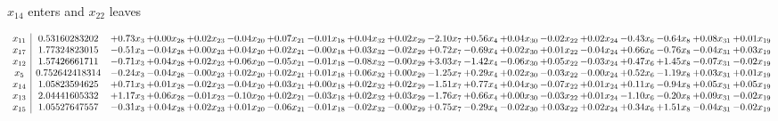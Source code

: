 \documentclass[9pt]{article}
\begin{document}
 $ x_{14} $ enters and $ x_{22} $ leaves 

 \[\begin{array}{c| c c@{\hskip 2pt} c@{\hskip 2pt} c@{\hskip 2pt} c@{\hskip 2pt} c@{\hskip 2pt} c@{\hskip 2pt} c@{\hskip 2pt} c@{\hskip 2pt} c@{\hskip 2pt} c@{\hskip 2pt} c@{\hskip 2pt} c@{\hskip 2pt} c@{\hskip 2pt} c@{\hskip 2pt} c@{\hskip 2pt} c@{\hskip 2pt} c@{\hskip 2pt} }
 x_{11}   &  0.53160283202 & +  0.73 x_{3} & +  0.00 x_{28} & +  0.02 x_{23} & -0.04 x_{20} & +  0.07 x_{21} & -0.01 x_{18} & +  0.04 x_{32} & +  0.02 x_{29} & -2.10 x_{7} & +  0.56 x_{4} & +  0.04 x_{30} & -0.02 x_{22} & +  0.02 x_{24} & -0.43 x_{6} & -0.64 x_{8} & +  0.08 x_{31} & +  0.01 x_{19}\\
 x_{17}   &  1.77324823015 & -0.51 x_{3} & -0.04 x_{28} & +  0.00 x_{23} & +  0.04 x_{20} & +  0.02 x_{21} & -0.00 x_{18} & +  0.03 x_{32} & -0.02 x_{29} & +  0.72 x_{7} & -0.69 x_{4} & +  0.02 x_{30} & +  0.01 x_{22} & -0.04 x_{24} & +  0.66 x_{6} & -0.76 x_{8} & -0.04 x_{31} & +  0.03 x_{19}\\
 x_{12}   &  1.57426661711 & -0.71 x_{3} & +  0.04 x_{28} & +  0.02 x_{23} & +  0.06 x_{20} & -0.05 x_{21} & -0.01 x_{18} & -0.08 x_{32} & -0.00 x_{29} & +  3.03 x_{7} & -1.42 x_{4} & -0.06 x_{30} & +  0.05 x_{22} & -0.03 x_{24} & +  0.47 x_{6} & +  1.45 x_{8} & -0.07 x_{31} & -0.02 x_{19}\\
 x_{5}   &  0.752642418314 & -0.24 x_{3} & -0.04 x_{28} & -0.00 x_{23} & +  0.02 x_{20} & +  0.02 x_{21} & +  0.01 x_{18} & +  0.06 x_{32} & +  0.00 x_{29} & -1.25 x_{7} & +  0.29 x_{4} & +  0.02 x_{30} & -0.03 x_{22} & -0.00 x_{24} & +  0.52 x_{6} & -1.19 x_{8} & +  0.03 x_{31} & +  0.01 x_{19}\\
 x_{14}   &  1.05823594625 & +  0.71 x_{3} & +  0.01 x_{28} & -0.02 x_{23} & -0.04 x_{20} & +  0.03 x_{21} & +  0.00 x_{18} & +  0.02 x_{32} & +  0.02 x_{29} & -1.51 x_{7} & +  0.77 x_{4} & +  0.04 x_{30} & -0.07 x_{22} & +  0.01 x_{24} & +  0.11 x_{6} & -0.94 x_{8} & +  0.05 x_{31} & +  0.05 x_{19}\\
 x_{13}   &  2.04441605332 & +  1.17 x_{3} & +  0.06 x_{28} & -0.01 x_{23} & -0.10 x_{20} & +  0.02 x_{21} & -0.03 x_{18} & +  0.02 x_{32} & +  0.03 x_{29} & -1.76 x_{7} & +  0.66 x_{4} & +  0.00 x_{30} & -0.03 x_{22} & +  0.01 x_{24} & -1.10 x_{6} & -0.20 x_{8} & +  0.09 x_{31} & -0.02 x_{19}\\
 x_{15}   &  1.05527647557 & -0.31 x_{3} & +  0.04 x_{28} & +  0.02 x_{23} & +  0.01 x_{20} & -0.06 x_{21} & -0.01 x_{18} & -0.02 x_{32} & -0.00 x_{29} & +  0.75 x_{7} & -0.29 x_{4} & -0.02 x_{30} & +  0.03 x_{22} & +  0.02 x_{24} & +  0.34 x_{6} & +  1.51 x_{8} & -0.04 x_{31} & -0.02 x_{19}\\

\end{array}\]
\end{document}
